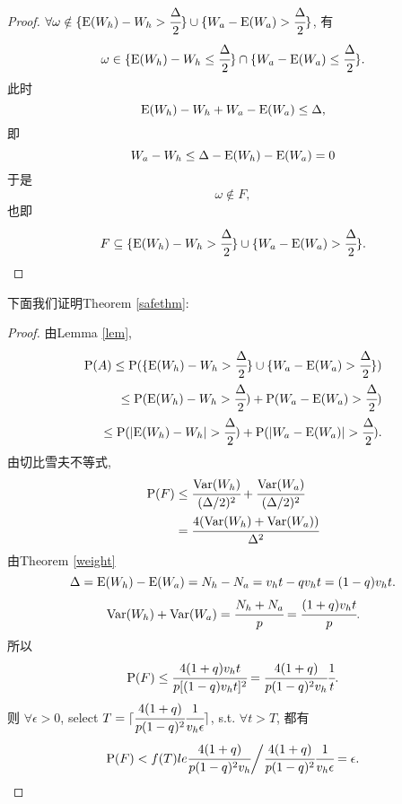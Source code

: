 \documentclass[UTF8]{ctexart}
\theoremstyle{definition}
\theoremstyle{plain}
\begin{document}
\begin{proof}
$\forall\omega\notin\{{\rm E}(W_h)-W_h>\cfrac{\Delta}{2}\} \cup \{W_a-{\rm E}(W_a)>\cfrac{\Delta}{2}\}$, 有
\[\omega\in \{{\rm E}(W_h)-W_h\le\cfrac{\Delta}{2}\} \cap \{W_a-{\rm E}(W_a)\le\cfrac{\Delta}{2}\}.\] 此时
\[{\rm E}(W_h)-W_h+W_a-{\rm E}(W_a)\le\Delta,\]即
\[W_a-W_h \le \Delta - {\rm E}(W_h)-{\rm E}(W_a)= 0 \]
于是\[\omega \notin F,\] 也即\[F \subseteq \{{\rm E}(W_h)-W_h>\cfrac{\Delta}{2}\} \cup \{W_a-{\rm E}(W_a)>\cfrac{\Delta}{2}\}.\]
\end{proof}

下面我们证明Theorem \ref{safethm}:
\begin{proof}
    由Lemma \ref{lem},
    \begin{align*}
        {\rm P}(A) \le {\rm P}(\{{\rm E}(W_h)-W_h>\cfrac{\Delta}{2}\} \cup \{W_a-{\rm E}(W_a)>\cfrac{\Delta}{2}\}) \\ \le 
    {\rm P}({\rm E}(W_h)-W_h>\cfrac{\Delta}{2})+{\rm P}(W_a-{\rm E}(W_a)>\cfrac{\Delta}{2}) \\ 
    \le {\rm P}(|{\rm E}(W_h)-W_h|>\cfrac{\Delta}{2})+{\rm P}(|W_a-{\rm E}(W_a)|>\cfrac{\Delta}{2}).
    \end{align*}
    由切比雪夫不等式, 
    \begin{align*}
        {\rm P}(F) &\le \cfrac{{\rm Var}(W_h)}{(\Delta/2)^2} + \cfrac{{\rm Var}(W_a)}{(\Delta/2)^2} \\ 
        &=  \cfrac{4({\rm Var}(W_h)+{\rm Var}(W_a))}{\Delta^2}
    \end{align*}
    由Theorem \ref{weight}
    \[\Delta = {\rm E}(W_h)-{\rm E}(W_a) = N_h - N_a = v_ht-qv_ht=(1-q)v_ht.\]
    \[{\rm Var}(W_h) + {\rm Var}(W_a) = \cfrac{N_h+N_a}{p} = \cfrac{(1+q)v_ht}{p}.\]
    所以 \[{\rm P}(F) \le \cfrac{4(1+q)v_ht}{p [(1-q)v_ht]^2} = \cfrac{4(1+q)}{p(1-q)^2v_h} \cfrac{1}{t}. \]
    则
    $\forall \epsilon>0$, select $T = \lceil \cfrac{4(1+q)}{p(1-q)^2} \cfrac{1}{v_h \epsilon} \rceil$, s.t. $\forall t>T$, 都有
    \[{\rm P}(F) < f(T) le \cfrac{4(1+q)}{p(1-q)^2v_h}\bigg/\cfrac{4(1+q)}{p(1-q)^2} \cfrac{1}{v_h \epsilon} = \epsilon.\]
\end{proof}
\end{document}
